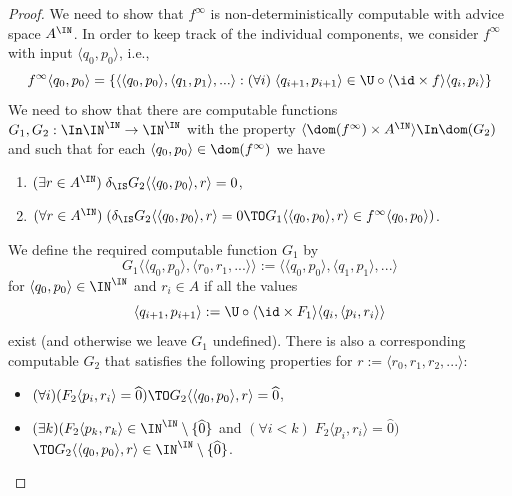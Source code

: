 \documentclass{lmcs}
\begin{document}
\begin{proof}
We need to show that $f^\infty$ is non-deterministically computable with advice space $A^\IN$.
In order to keep track of the individual components, we consider $f^\infty$ with input $\langle q_0,p_0\rangle$, i.e.,
\[f^\infty\langle q_0,p_0\rangle=\{\langle\langle q_0,p_0\rangle,\langle q_1,p_1\rangle,...\rangle:
(\forall i)\;\langle q_{i+1},p_{i+1}\rangle\in\U\circ\langle\id\times f\rangle\langle q_i,p_i\rangle\}\]
We need to show that there are computable functions $G_1,G_2:\In\IN^\IN\to\IN^\IN$ 
with the property
$\langle \dom(f^\infty)\times A^\IN\rangle\In\dom(G_2)$ and such that for each $\langle q_0,p_0\rangle\in\dom(f^\infty)$ we have
\begin{enumerate}
\item $(\exists r\in A^\IN)\;\delta_\IS G_2\langle\langle q_0,p_0\rangle,r\rangle=0$,
\item $(\forall r\in A^\IN)\;(\delta_\IS G_2\langle \langle q_0,p_0\rangle,r\rangle=0\TO G_1\langle \langle q_0,p_0\rangle,r\rangle\in f^\infty\langle q_0,p_0\rangle)$.
\end{enumerate}
We define the required computable function $G_1$ by
\[G_1\langle\langle q_0,p_0\rangle,\langle r_0,r_1,...\rangle\rangle:=\langle\langle q_0,p_0\rangle,\langle q_1,p_1\rangle,...\rangle\]
for $\langle q_0,p_0\rangle\in\IN^\IN$ and $r_i\in A$ if all the values
\[\langle q_{i+1},p_{i+1}\rangle:=\U\circ\langle\id\times F_1\rangle\langle q_i,\langle p_i,r_i\rangle\rangle\]
exist (and otherwise we leave $G_1$ undefined). There is also a corresponding computable $G_2$ that satisfies
the following properties for $r:=\langle r_0,r_1,r_2,...\rangle$:
\begin{itemize}
\item $(\forall i)(F_2\langle p_i,r_i\rangle=\widehat{0})\TO G_2\langle\langle q_0,p_0\rangle,r\rangle=\widehat{0}$,
\item $(\exists k)(F_2\langle p_k,r_k\rangle\in\IN^\IN\setminus\{\widehat{0}\}$ and $(\forall i<k)\;F_2\langle p_i,r_i\rangle=\widehat{0})$\\ $\TO G_2\langle\langle q_0,p_0\rangle,r\rangle\in\IN^\IN\setminus\{\widehat{0}\}$.
\end{itemize}


\end{proof}
\end{document}
